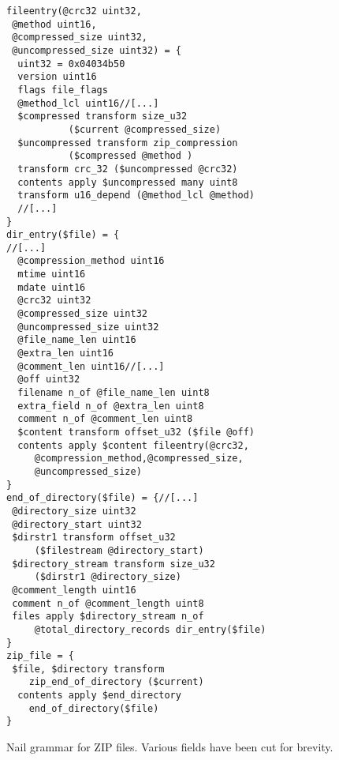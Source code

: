 \begin{figure}
\begin{verbatim}
fileentry(@crc32 uint32,
 @method uint16,
 @compressed_size uint32, 
 @uncompressed_size uint32) = { 
  uint32 = 0x04034b50
  version uint16
  flags file_flags
  @method_lcl uint16//[...]
  $compressed transform size_u32 
           ($current @compressed_size)
  $uncompressed transform zip_compression 
           ($compressed @method )
  transform crc_32 ($uncompressed @crc32)
  contents apply $uncompressed many uint8
  transform u16_depend (@method_lcl @method)
  //[...]
}
dir_entry($file) = {
//[...]  
  @compression_method uint16      
  mtime uint16
  mdate uint16
  @crc32 uint32
  @compressed_size uint32
  @uncompressed_size uint32
  @file_name_len uint16
  @extra_len uint16
  @comment_len uint16//[...]
  @off uint32
  filename n_of @file_name_len uint8
  extra_field n_of @extra_len uint8
  comment n_of @comment_len uint8
  $content transform offset_u32 ($file @off)
  contents apply $content fileentry(@crc32,
     @compression_method,@compressed_size, 
     @uncompressed_size)
}
end_of_directory($file) = {//[...]
 @directory_size uint32 
 @directory_start uint32
 $dirstr1 transform offset_u32 
     ($filestream @directory_start) 
 $directory_stream transform size_u32 
     ($dirstr1 @directory_size)
 @comment_length uint16
 comment n_of @comment_length uint8
 files apply $directory_stream n_of 
     @total_directory_records dir_entry($file)
}
zip_file = { 
 $file, $directory transform 
    zip_end_of_directory ($current)
  contents apply $end_directory
    end_of_directory($file)
}
\end{verbatim}
\caption{Nail grammar for ZIP files. Various fields have been cut for brevity.}
\label{fig:zip-extract}
\end{figure}
